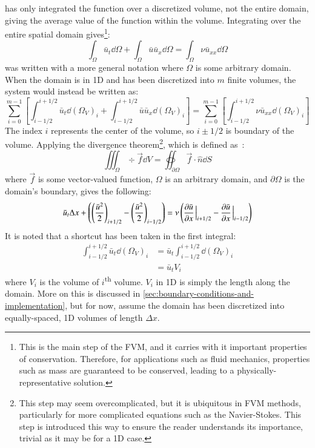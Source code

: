  has only integrated the function over a discretized volume, not the entire domain, giving the average value of the function within the volume.
Integrating over the entire spatial domain gives\footnote{This is the main step of the FVM, and it carries with it important properties of conservation. Therefore, for applications such as fluid mechanics, properties such as mass are guaranteed to be conserved, leading to a physically-representative solution.}:
\begin{equation}
	\label{eq:finite-volume-aribitrary-domain}
	\int_{\Omega}\bar{u}_t \dd \Omega + \int_{\Omega}  \bar{u}\bar{u}_x\dd \Omega = \int_{\Omega}\nu \bar{u}_{xx}\dd \Omega
\end{equation}
 was written with a more general notation where $\Omega$ is some arbitrary domain.
When the domain is in 1D and has been discretized into $m$ finite volumes, the system would instead be written as:
\begin{equation}
	\label{eq:finite-volume-implemented}
	\sum_{i=0}^{m-1} \left[  \int_{i-1/2}^{i+1/2} \bar{u}_t \dd \left(\Omega_V\right)_i+\int_{i-1/2}^{i+1/2} \bar{u}\bar{u}_x \dd \left(\Omega_V\right)_i \right]=\sum_{i=0}^{m-1}\left[ \int_{i-1/2}^{i+1/2} \nu \bar{u}_{xx}\dd \left(\Omega_V\right)_i \right]
\end{equation}
The index $i$ represents the center of the volume, so $i\pm 1/2$ is boundary of the volume.
Applying the divergence theorem\footnote{This step may seem overcomplicated, but it is ubiquitous in FVM methods, particularly for more complicated equations such as the Navier-Stokes. This step is introduced this way to ensure the reader understands its importance, trivial as it may be for a 1D case.}, which is defined as~\autocite{CalculusIIIDivergence}:
\begin{equation}
	\label{eq:divergence-thm}
	\iiint_{\Omega}\div \vec{f}\dd V = \oiint_{\partial \Omega} \vec{f}\cdot \hat{n}\dd S
\end{equation}
where $\vec{f}$ is some vector-valued function, $\Omega$ is an arbitrary domain, and $\partial \Omega$ is the domain's boundary, gives the following:
\begin{equation}
	\label{eq:finite-volume-solution}
	\bar{u}_t \Delta x +\left( \left( \frac{\bar{u}^2}{2}\right)_{i+1/2}-\left( \frac{\bar{u}^2}{2}\right)_{i-1/2} \right)=\nu \left( \pdv{\bar{u}}{x}\eval_{i+1/2}-\pdv{\bar{u}}{x}\eval_{i-1/2} \right)
\end{equation}
It is noted that a shortcut has been taken in the first integral:
\begin{equation*}
	\begin{split}
		\int_{i-1/2}^{i+1/2} \bar{u}_t \dd \left(\Omega_V\right)_i&=\bar{u}_t\int_{i-1/2}^{i+1/2} \dd \left(\Omega_V\right)_i\\
		&=\bar{u}_{t}V_i
	\end{split}
\end{equation*}
where $V_i$ is the volume of $i$\textsuperscript{th} volume.
$V_i$ in 1D is simply the length along the domain.
More on this is discussed in \cref{sec:boundary-conditions-and-implementation}, but for now, assume the domain has been discretized into equally-spaced, 1D volumes of length $\Delta x$.

